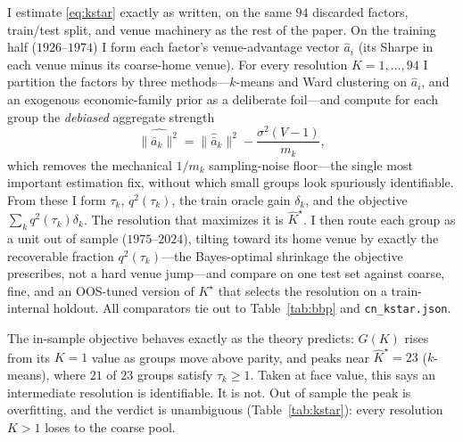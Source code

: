 \documentclass[12pt]{article}
\theoremstyle{plain}
\theoremstyle{definition}
\begin{document}
I estimate \eqref{eq:kstar} exactly as written, on the same $94$ discarded
factors, train/test split, and venue machinery as the rest of the paper. On the
training half ($1926$--$1974$) I form each factor's venue-advantage vector
$\hat a_i$ (its Sharpe in each venue minus its coarse-home venue). For every
resolution $K=1,\dots,94$ I partition the factors by three methods---$k$-means
and Ward clustering on $\hat a_i$, and an exogenous economic-family prior as a
deliberate foil---and compute for each group the \emph{debiased} aggregate
strength
\[
\widehat{\lVert\bar a_k\rVert^2}
=\lVert\hat{\bar a}_k\rVert^2-\frac{\sigma^2(V-1)}{m_k},
\]
which removes the mechanical $1/m_k$ sampling-noise floor---the single most
important estimation fix, without which small groups look spuriously
identifiable. From these I form $\tau_k$, $q^2(\tau_k)$, the train oracle gain
$\delta_k$, and the objective $\sum_k q^2(\tau_k)\delta_k$. The resolution that
maximizes it is $\hat K^\star$. I then route each group as a unit out of sample
($1975$--$2024$), tilting toward its home venue by exactly the recoverable
fraction $q^2(\tau_k)$---the Bayes-optimal shrinkage the objective prescribes, not
a hard venue jump---and compare on one test set against coarse, fine, and an
OOS-tuned version of $K^\star$ that selects the resolution on a train-internal
holdout. All comparators tie out to Table~\ref{tab:bbp} and
\texttt{cn\_kstar.json}.

The in-sample objective behaves exactly as the theory predicts: $G(K)$ rises from
its $K=1$ value as groups move above parity, and peaks near $\hat K^\star=23$
($k$-means), where $21$ of $23$ groups satisfy $\tau_k\ge 1$. Taken at face value,
this says an intermediate resolution is identifiable. It is not. Out of sample the
peak is overfitting, and the verdict is unambiguous (Table~\ref{tab:kstar}): every
resolution $K>1$ loses to the coarse pool.
\end{document}
